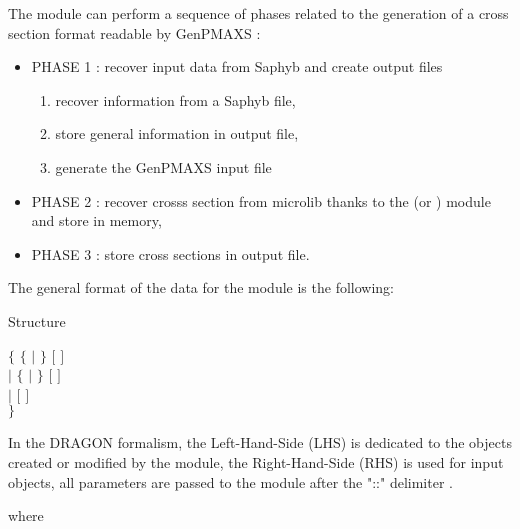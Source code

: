 The  module can perform a sequence of phases related to the generation of a cross section format readable by GenPMAXS :
\begin{itemize}
\item PHASE 1 : recover input data from Saphyb and create output files
\begin{enumerate}
\item recover information from a Saphyb file,
\item store general information in output file,
\item generate the GenPMAXS input file
\end{enumerate}
\item PHASE 2 : recover crosss section from microlib thanks to the  (or ) module and store in memory,
\item PHASE 3 : store cross sections in output file.
\end{itemize}


\noindent
The general format of the data for the  module is the following:

\begin{DataStructure}{Structure }

$\lbrace$
     $\lbrace$  $\vert$   $ \rbrace$ \moc{::}   $[$   $]$ \\
$\vert$
            $\lbrace$  $\vert$   $ \rbrace$  \moc{::}   $[$   $]$\\
$\vert$
               \moc{::}    $[$   $]$\\
$\rbrace$
\end{DataStructure}
In the DRAGON formalism, the Left-Hand-Side (LHS) is dedicated to the objects created or modified by the module, the Right-Hand-Side (RHS) is used for input objects, all parameters are passed to the module after the "::" delimiter .

\noindent where

